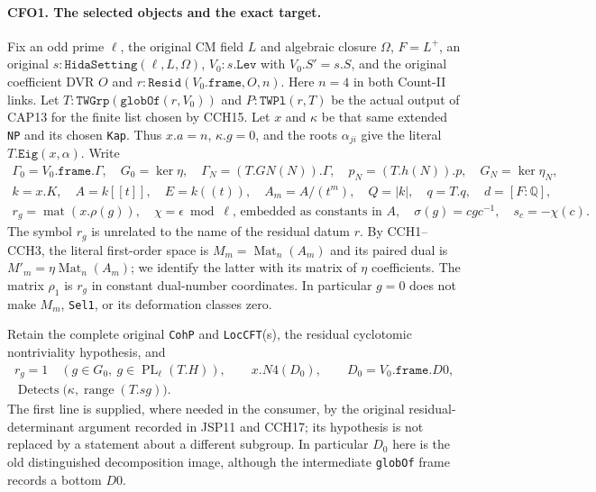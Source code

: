 \paragraph{CFO1. The selected objects and the exact target.}
\label{claim:CFO1}
Fix an odd prime $\ell$, the original CM field $L$ and algebraic
closure $\Omega$, $F=L^+$, an original
$s:\texttt{HidaSetting}(\ell,L,\Omega)$, $V_0:s.\texttt{Lev}$ with
$V_0.S'=s.S$, and the original coefficient DVR $O$ and
$r:\texttt{Resid}(V_0.\texttt{frame},O,n)$.  Here $n=4$ in both
Count-II links.  Let $T:\texttt{TWGrp}(\texttt{globOf}(r,V_0))$ and
$P:\texttt{TWPl}(r,T)$ be the actual output of CAP13 for the finite
list chosen by CCH15.  Let $x$ and $\kappa$ be that same extended
\texttt{NP} and its chosen \texttt{Kap}.  Thus $x.a=n$,
$\kappa.g=0$, and the roots $\alpha_{ji}$ give the literal
$T.\texttt{Eig}(x,\alpha)$.  Write
\[
 \begin{gathered}
 \Gamma_0=V_0.\texttt{frame}.\Gamma,\quad
 G_0=\ker\eta,\quad \Gamma_N=(T.GN(N)).\Gamma,\quad
 p_N=(T.h(N)).p,\quad G_N=\ker\eta_N,\\
 k=x.K,\quad A=k[[t]],\quad E=k((t)),\quad A_m=A/(t^m),
 \quad Q=|k|,\quad q=T.q,\quad d=[F:\mathbb Q],\\
 r_g=\operatorname{mat}(x.\rho(g)),\quad
 \chi=\epsilon\bmod\ell\text{, embedded as constants in }A,
 \quad \sigma(g)=cgc^{-1},\quad s_c=-\chi(c).
 \end{gathered}                                                   \tag{CFO.2}
\]
The symbol $r_g$ is unrelated to the name of the residual datum $r$.
By CCH1--CCH3, the literal first-order space is
$M_m=\operatorname{Mat}_n(A_m)$ and its paired dual is
$M'_m=\eta\operatorname{Mat}_n(A_m)$; we identify the latter with
its matrix of $\eta$ coefficients.  The matrix $\rho_1$ is $r_g$
in constant dual-number coordinates.  In particular $g=0$ does
not make $M_m$, \texttt{Sel1}, or its deformation classes zero.

Retain the complete original \texttt{CohP} and \texttt{LocCFT}(s),
the residual cyclotomic nontriviality hypothesis, and
\[
 \begin{gathered}
 r_g=1\quad(g\in G_0,\ g\in\operatorname{PL}_\ell(T.H)),\qquad
 x.N4(D_0),\qquad D_0=V_0.\texttt{frame}.D0,\\
 \operatorname{Detects}\bigl(\kappa,\operatorname{range}(T.sg)\bigr).
 \end{gathered}                                                   \tag{CFO.3}
\]
The first line is supplied, where needed in the consumer, by the
original residual-determinant argument recorded in JSP11 and
CCH17; its hypothesis is not replaced by a statement about a
different subgroup.  In particular $D_0$ here is the old
distinguished decomposition image, although the intermediate
\texttt{globOf} frame records a bottom $D0$.

